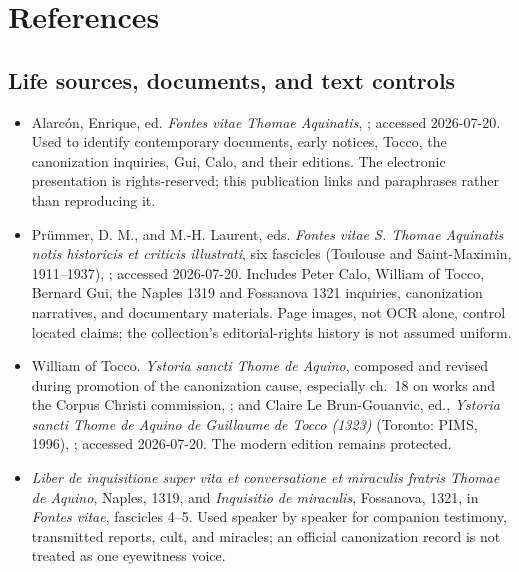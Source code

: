 \section{References}
\label{sec:aquinas-references}

\subsection{Life sources, documents, and text controls}

\begin{itemize}
\item Alarcón, Enrique, ed.  \emph{Fontes vitae Thomae Aquinatis},
; accessed 2026-07-20.  Used to identify contemporary documents,
early notices, Tocco, the canonization inquiries, Gui, Calo, and their editions.
The electronic presentation is rights-reserved; this publication links and
paraphrases rather than reproducing it.

\item Prümmer, D. M., and M.-H. Laurent, eds.  \emph{Fontes vitae S. Thomae
Aquinatis notis historicis et criticis illustrati}, six fascicles (Toulouse and
Saint-Maximin, 1911--1937),
;
accessed 2026-07-20.  Includes Peter Calo, William of Tocco, Bernard Gui, the
Naples 1319 and Fossanova 1321 inquiries, canonization narratives, and
documentary materials.  Page images, not OCR alone, control located claims;
the collection's editorial-rights history is not assumed uniform.

\item William of Tocco.  \emph{Ystoria sancti Thome de Aquino}, composed and
revised during promotion of the canonization cause, especially ch.~18 on works
and the Corpus Christi commission,
;
and Claire Le Brun-Gouanvic, ed., \emph{Ystoria sancti Thome de Aquino de
Guillaume de Tocco (1323)} (Toronto: PIMS, 1996),
;
accessed 2026-07-20.  The modern edition remains protected.

\item \emph{Liber de inquisitione super vita et conversatione et miraculis
fratris Thomae de Aquino}, Naples, 1319, and \emph{Inquisitio de miraculis},
Fossanova, 1321, in \emph{Fontes vitae}, fascicles 4--5.  Used speaker by
speaker for companion testimony, transmitted reports, cult, and miracles; an
official canonization record is not treated as one eyewitness voice.


\end{itemize}
